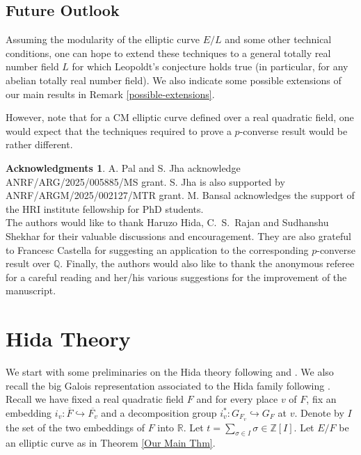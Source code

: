 \documentclass[reqno,10pt]{amsart}
\newcommand{\z}{\mathbb{Z}}
\theoremstyle{plain}
\theoremstyle{definition}
\newtheorem*{acknowledgements}{Acknowledgments}
\begin{document}
\subsection{Future Outlook}
Assuming the modularity of the elliptic curve $E/L$ and some other technical conditions, one can hope to extend these techniques to a general totally real number field $L$ for which Leopoldt's conjecture holds true (in particular, for any abelian totally real number field). We also indicate some possible extensions of our main results in Remark \ref{possible-extensions}.

However, note that for a CM elliptic curve defined over a real quadratic field, one would expect that the techniques required to prove a $p$-converse result would be rather different.


 \begin{acknowledgements}
	A. Pal and S. Jha acknowledge ANRF/ARG/2025/005885/MS grant. S. Jha is also supported by ANRF/ARGM/2025/002127/MTR grant. M. Bansal acknowledges the support of the HRI institute fellowship for PhD students.
\\
 The authors would like to thank Haruzo Hida, C.~S.~Rajan and Sudhanshu Shekhar for their valuable discussions and encouragement. They are also grateful to Francesc Castella for suggesting an application to the corresponding  \( p \)-converse result over \( \mathbb{Q} \). Finally, the authors would also like to thank the anonymous referee for a careful reading and her/his various suggestions for the improvement of the manuscript.

    \end{acknowledgements}       
        

\section{Hida Theory}
We start with some preliminaries on the Hida theory following \cite{Hida1} and \cite{MokExceptionalZero}. We also recall the big Galois representation associated to the Hida family following \cite{Nekovar}.
\\
Recall we have  fixed a real quadratic field $F$ and for every place $v$ of $F$, fix an embedding $i_v : \overline{F} \hookrightarrow \overline{F_v}$ and a decomposition group $i_v^* : G_{F_v} \hookrightarrow G_F$ at $v$. Denote by $I$ the set of the two embeddings of $F$ into $\mathbb{R}$. Let $t = \sum_{\sigma \in I} \sigma \in \z[I]$. Let $E/F$ be an elliptic curve as in Theorem \ref{Our Main Thm}.
\end{document}
